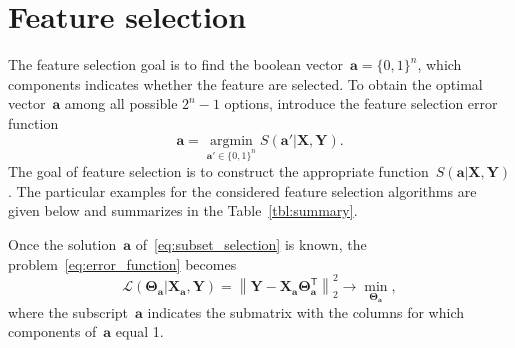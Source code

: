 \documentclass[12pt,twoside]{article}
\theoremstyle{definition}
\newcommand{\ba}{\mathbf{a}}
\newcommand{\bY}{\mathbf{Y}}
\newcommand{\bX}{\mathbf{X}}
\newcommand{\T}{\mathsf{T}}
\newcommand{\bTheta}{\boldsymbol{\Theta}}
\newcommand{\argmin}{\mathop{\arg \min}\limits}
\begin{document}
 \section{Feature selection}
 The feature selection goal is to find the boolean vector~$\ba = \{0, 1\}^n$, which components indicates whether the feature are selected. To obtain the optimal vector~$\ba$ among all possible $2^n - 1$ options, introduce the feature selection error function
\begin{equation}
	\ba = \argmin_{\ba' \in \{0, 1\}^n} S(\ba' | \bX, \bY).
	\label{eq:subset_selection}
\end{equation}
The goal of feature selection is to construct the appropriate function~$S(\ba | \bX, \bY)$. The particular examples for the considered feature selection algorithms are given below and summarizes in the Table~\ref{tbl:summary}.

Once the solution~$\ba$ of~\eqref{eq:subset_selection} is known, the problem~\eqref{eq:error_function} becomes
\begin{equation}
\mathcal{L}(\bTheta_{\ba} | \bX_{\ba}, \bY) = {\left\| \mathbf{Y} - \bX_{\ba}\bTheta^{\T}_{\ba} \right\| }_2^2 \rightarrow\min_{\bTheta_{\ba}},
\end{equation}
where the subscript~$\ba$ indicates the submatrix with the columns for which components of~$\ba$ equal 1.
\end{document}
